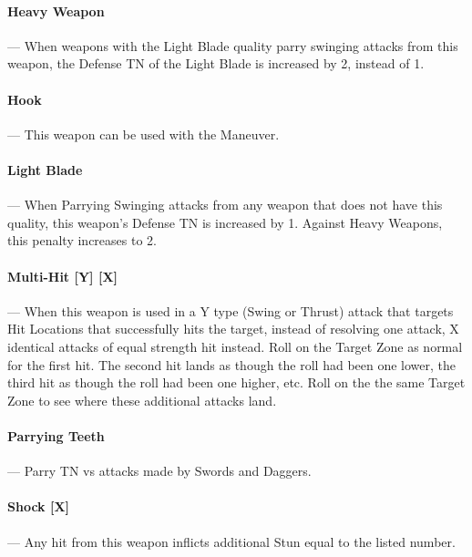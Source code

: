 \documentclass[oneside,11pt,english]{book}
\begin{document}
\vspace{-5pt}\paragraph{\label{wepqual:Heavy Weapon}Heavy Weapon}---\quad
When weapons with the Light Blade quality parry swinging attacks from this weapon, the Defense TN of the Light Blade is increased by 2, instead of 1.

\vspace{-5pt}\paragraph{\label{wepqual:Hook}Hook}---\quad
This weapon can be used with the  Maneuver.

\vspace{-5pt}\paragraph{\label{wepqual:Light Blade}Light Blade}---\quad
When Parrying Swinging attacks from any weapon that does not have this quality, this weapon’s Defense TN is increased by 1. Against Heavy Weapons, this penalty increases to 2.

\vspace{-5pt}\paragraph[Multi-Hit]{\label{wepqual:Multi-Hit}Multi-Hit [Y] [X]}---\quad
When this weapon is used in a Y type (Swing or Thrust) attack that targets Hit
Locations that successfully hits the target, instead of resolving one attack, X
identical attacks of equal strength hit instead. Roll on the Target Zone as
normal for the first hit. The second hit lands as though the roll had been one
lower, the third hit as though the roll had been one higher, etc. Roll on the
the same Target Zone to see where these additional attacks land. 

\vspace{-5pt}\paragraph{\label{wepqual:Parrying Teeth}Parrying Teeth}--- Parry TN vs attacks made by Swords and Daggers.

\vspace{-5pt}\paragraph[Shock]{\label{wepqual:Shock}Shock [X]}---\quad
Any hit from this weapon inflicts additional Stun equal to the listed number.
\end{document}
